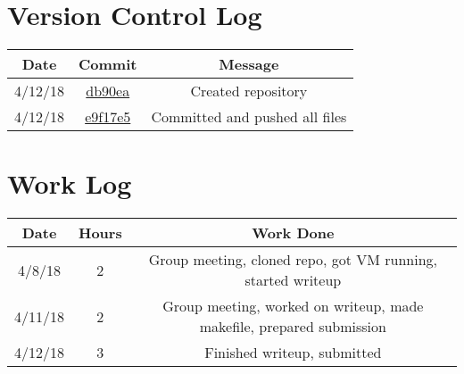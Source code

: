 \documentclass[onecolumn, draftclsnofoot,10pt, compsoc]{IEEEtran}
\begin{document}
\section{Version Control Log}
\begin{center}
 \begin{tabular}{||c c c||} 
 \hline
 Date & Commit & Message \\ [0.5ex] 
 \hline\hline
 4/12/18 & \href{https://github.com/borkarr/cs544/commit/db90eab00be7fddb4e022215812f586a14240340}{db90ea} & Created repository\\
 \hline
 4/12/18 & \href{https://github.com/borkarr/cs544/commit/e9f17e5be28a0fd70411ba88db099cbd89be4f97}{e9f17e5} & Committed and pushed all files\\ 
 [1ex] 
 \hline
\end{tabular}
\end{center}

\section{Work Log}
\begin{center}
 \begin{tabular}{||c c c ||} 
 \hline
 Date & Hours & Work Done\\ [0.5ex] 
 \hline\hline
 4/8/18 & 2 & Group meeting, cloned repo, got VM running, started writeup\\ 
 \hline
  4/11/18 & 2 & Group meeting, worked on writeup, made makefile, prepared submission\\ 
 \hline
 4/12/18 & 3 & Finished writeup, submitted\\
 [1ex] 
 \hline
\end{tabular}
\end{center}


\end{document}
